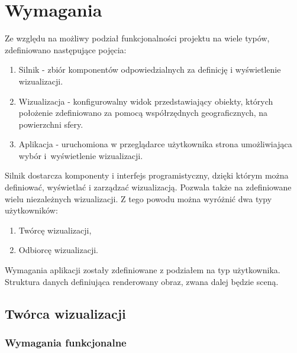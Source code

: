 \chapter{Wymagania}

Ze względu na możliwy podział funkcjonalności projektu na wiele typów, zdefiniowano następujące pojęcia:
\begin{enumerate}
    \item Silnik - zbiór komponentów odpowiedzialnych za definicję i wyświetlenie wizualizacji.
    \item Wizualizacja - konfigurowalny widok przedstawiający obiekty, których położenie zdefiniowano za pomocą współrzędnych geograficznych, na powierzchni sfery.
    \item Aplikacja - uruchomiona w przeglądarce użytkownika strona umożliwiająca wybór i~wyświetlenie wizualizacji.
\end{enumerate}

Silnik dostarcza komponenty i interfejs programistyczny, dzięki którym można definiować, wyświetlać i zarządzać wizualizacją.
Pozwala także na zdefiniowane wielu niezależnych wizualizacji. Z tego powodu można wyróżnić dwa typy użytkowników:

\begin{enumerate}
    \item Twórcę wizualizacji,
    \item Odbiorcę wizualizacji.
\end{enumerate}

Wymagania aplikacji zostały zdefiniowane z podziałem na typ użytkownika.
Struktura danych definiująca renderowany obraz, zwana dalej będzie sceną.


\section{Twórca wizualizacji}

\subsection{Wymagania funkcjonalne}

